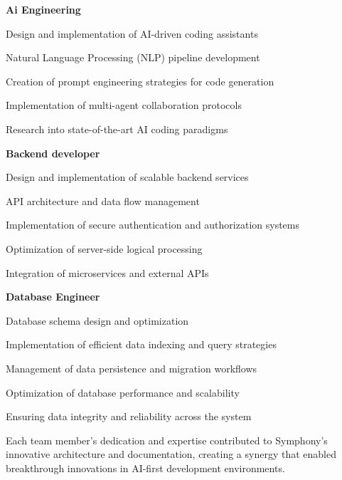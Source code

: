 \begin{description}[leftmargin=4cm,labelwidth=3.5cm]
    \item[\textbf{Nour El-Din Osama Fathy El-Anany}] \textbf{Ai Engineering}
    \begin{compactlist}
        \item Design and implementation of AI-driven coding assistants
        \item Natural Language Processing (NLP) pipeline development
        \item Creation of prompt engineering strategies for code generation
        \item Implementation of multi-agent collaboration protocols
        \item Research into state-of-the-art AI coding paradigms
    \end{compactlist}
    
    \item[\textbf{Salma Ebrahim farouk}] \textbf{Backend developer}
    \begin{compactlist}
        \item Design and implementation of scalable backend services
        \item API architecture and data flow management
        \item Implementation of secure authentication and authorization systems
        \item Optimization of server-side logical processing
        \item Integration of microservices and external APIs
    \end{compactlist}
    
    \item[\textbf{Mohamed Ibrahim Mohamed Ahmed}] \textbf{Database Engineer}
    \begin{compactlist}
        \item Database schema design and optimization
        \item Implementation of efficient data indexing and query strategies
        \item Management of data persistence and migration workflows
        \item Optimization of database performance and scalability
        \item Ensuring data integrity and reliability across the system
    \end{compactlist}
\end{description}

Each team member's dedication and expertise contributed to Symphony's innovative architecture and  documentation, creating a synergy that enabled breakthrough innovations in AI-first development environments.

